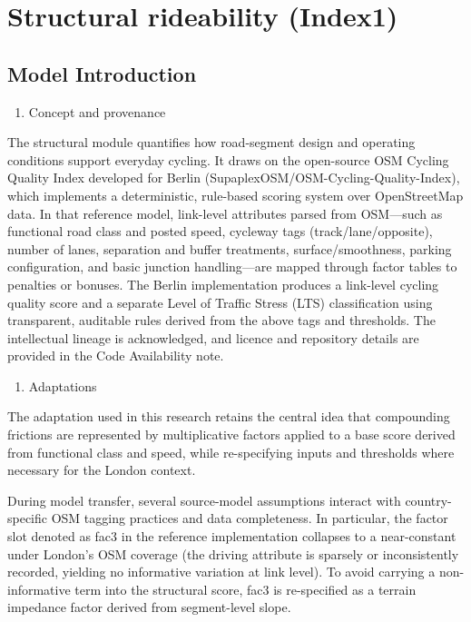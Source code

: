 \documentclass[
  12pt,
  oneside]{book}
\providecommand{\tightlist}{%
  \setlength{\itemsep}{0pt}\setlength{\parskip}{0pt}}
\begin{document}
\section{Structural rideability (Index1)}\label{structural-rideability-index1}

\subsection{Model Introduction}\label{model-introduction}

\begin{enumerate}
\def\labelenumi{\arabic{enumi}.}
\tightlist
\item
  Concept and provenance
\end{enumerate}

The structural module quantifies how road-segment design and operating conditions support everyday cycling. It draws on the open-source OSM Cycling Quality Index developed for Berlin (SupaplexOSM/OSM-Cycling-Quality-Index), which implements a deterministic, rule-based scoring system over OpenStreetMap data. In that reference model, link-level attributes parsed from OSM---such as functional road class and posted speed, cycleway tags (track/lane/opposite), number of lanes, separation and buffer treatments, surface/smoothness, parking configuration, and basic junction handling---are mapped through factor tables to penalties or bonuses. The Berlin implementation produces a link-level cycling quality score and a separate Level of Traffic Stress (LTS) classification using transparent, auditable rules derived from the above tags and thresholds. The intellectual lineage is acknowledged, and licence and repository details are provided in the Code Availability note.

\begin{enumerate}
\def\labelenumi{\arabic{enumi}.}
\setcounter{enumi}{1}
\tightlist
\item
  Adaptations
\end{enumerate}

The adaptation used in this research retains the central idea that compounding frictions are represented by multiplicative factors applied to a base score derived from functional class and speed, while re-specifying inputs and thresholds where necessary for the London context.

During model transfer, several source-model assumptions interact with country-specific OSM tagging practices and data completeness. In particular, the factor slot denoted as fac3 in the reference implementation collapses to a near-constant under London's OSM coverage (the driving attribute is sparsely or inconsistently recorded, yielding no informative variation at link level). To avoid carrying a non-informative term into the structural score, fac3 is re-specified as a terrain impedance factor derived from segment-level slope.
\end{document}
